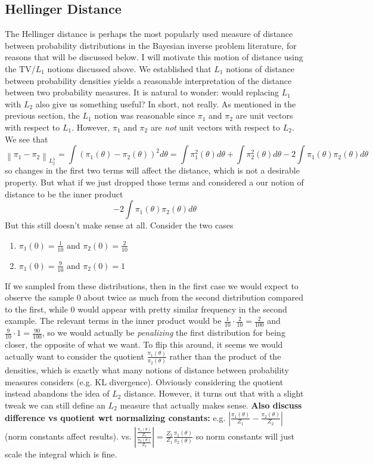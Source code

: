 \documentclass[12pt]{article}
\newcommand*{\norm}[1]{\left\lVert#1\right\rVert}
\newcommand*{\abs}[1]{\left\lvert#1\right\rvert}
\begin{document}
\subsection{Hellinger Distance}
The Hellinger distance is perhaps the most popularly used measure of distance between probability distributions in the Bayesian inverse problem literature, for reasons that will be discussed below. I will motivate this motion of distance using the $\text{TV}$/$L_1$ notions discussed above. We established that $L_1$ notions of distance between probability densities yields a reasonable interpretation of the distance between two probability measures. It is natural to wonder: would replacing $L_1$ with $L_2$ also give us something useful? In short, not really. As mentioned in the previous section, the $L_1$ notion was reasonable since $\pi_1$ and $\pi_2$ are unit vectors with respect to $L_1$. However, $\pi_1$ and $\pi_2$ are \textit{not} unit vectors with respect to $L_2$. We see that 
\[\norm{\pi_1 - \pi_2}_{L_2^\lambda} = \int (\pi_1(\theta) - \pi_2(\theta))^2 d\theta = \int \pi_1^2(\theta) d\theta + \int \pi_2^2(\theta) d\theta - 2\int \pi_1(\theta)\pi_2(\theta) d\theta\]
so changes in the first two terms will affect the distance, which is not a desirable property. But what if we just dropped those terms and considered a our notion of distance to be the inner product 
\[- 2\int \pi_1(\theta)\pi_2(\theta) d\theta\]
But this still doesn't make sense at all. Consider the two cases
\begin{enumerate}
\item $\pi_1(0) = \frac{1}{10} \text{ and } \pi_2(0) = \frac{2}{10}$
\item $\pi_1(0) = \frac{9}{10} \text{ and } \pi_2(0) = 1$
\end{enumerate}
If we sampled from these distributions, then in the first case we would expect to observe the sample $0$ about twice as much from the second distribution compared to the first, while $0$ would appear with pretty similar frequency in the second example. The relevant terms in the inner product would be $\frac{1}{10} \cdot \frac{2}{10} = \frac{2}{100}$ and $\frac{9}{10} \cdot 1 = \frac{90}{100}$, so we would actually be \textit{penalizing} the first distribution for being closer, the opposite of what we want. To flip this around, it seems we would actually want to consider the quotient $\frac{\pi_1(\theta)}{\pi_2(\theta)}$ rather than the product of the densities, which is exactly what many notions of distance between probability measures considers (e.g. KL divergence). Obviously considering the quotient instead abandons the idea of $L_2$ distance. However, it turns out that with a slight tweak we can still define an $L_2$ measure that actually makes sense. 
\textbf{Also discuss difference vs quotient wrt normalizing constants:} e.g. $\abs{\frac{\pi_1(\theta)}{Z_1} - \frac{\pi_2(\theta)}{Z_2}}$ (norm constants affect results). vs. 
$\abs{\frac{\frac{\pi_1(\theta)}{Z_1}}{\frac{\pi_2(\theta)}{Z_2}}} = \frac{Z_2}{Z_1} \frac{\pi_1(\theta)}{\pi_2(\theta)}$ so norm constants will just scale the integral which is fine. 
\end{document}
